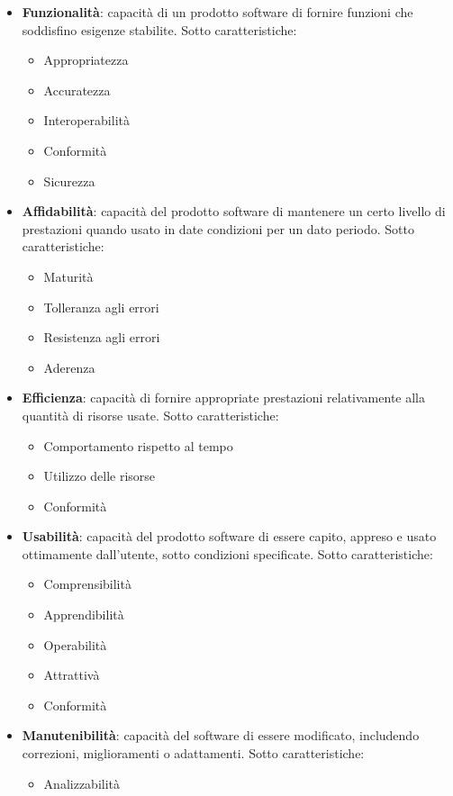 \begin{itemize}
\item \textbf{Funzionalità}: capacità di un prodotto software di fornire funzioni che soddisfino esigenze stabilite.
Sotto caratteristiche:
\begin{itemize}
\item Appropriatezza
\item Accuratezza
\item Interoperabilità
\item Conformità
\item Sicurezza
\end{itemize}
\item \textbf{Affidabilità}: capacità del prodotto software di mantenere un certo livello di prestazioni quando usato in date condizioni per un dato periodo.
Sotto caratteristiche:
\begin{itemize}
\item Maturità
\item Tolleranza agli errori
\item Resistenza agli errori
\item Aderenza
\end{itemize}
\item \textbf{Efficienza}: capacità di fornire appropriate prestazioni relativamente alla quantità di risorse usate.
Sotto caratteristiche:
\begin{itemize}
\item Comportamento rispetto al tempo
\item Utilizzo delle risorse
\item Conformità
\end{itemize}
\item \textbf{Usabilità}: capacità del prodotto software di essere capito, appreso e usato ottimamente dall'utente, sotto condizioni specificate.
Sotto caratteristiche:
\begin{itemize}
\item Comprensibilità
\item Apprendibilità
\item Operabilità
\item Attrattivà
\item Conformità
\end{itemize}
\item \textbf{Manutenibilità}: capacità del software di essere modificato, includendo correzioni, miglioramenti o adattamenti.
Sotto caratteristiche:
\begin{itemize}
\item Analizzabilità

\end{itemize}
\end{itemize}

